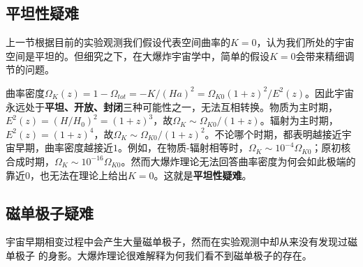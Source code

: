 \subsection{平坦性疑难}
上一节根据目前的实验观测我们假设代表空间曲率的$K=0$，认为我们所处的宇宙空间是平坦的。但细究之下，在大爆炸宇宙学中，简单的假设$K=0$会带来精细调节的问题。

曲率密度$\Omega_K(z) =
1-\Omega_{tot}=-K /{\left(Ha\right)}^2=\Omega_{K
0}{\left(1+z\right)}^2
/E^2(z)$。因此宇宙永远处于\textbf{平坦、开放、封闭}三种可能性之一，无法互相转换。物质为主时期，$E^2(z)={\left(H
/H_0\right)}^2={\left(1+z\right)}^3$，故$\Omega_K\sim \Omega_{K
0}
/{\left(1+z\right)}$。辐射为主时期，$E^2(z)={\left(1+z\right)}^{4}$，故$\Omega_K\sim\Omega_{K
0}
/{\left(1+z\right)}^2$。不论哪个时期，都表明越接近宇宙早期，曲率密度越接近$1$。例如，在物质-辐射相等时，$\Omega_K\sim
10^{-4}\Omega_{K 0}$；原初核合成时期，$\Omega_K\sim 10^{-16}\Omega_{K
0}$。然而大爆炸理论无法回答曲率密度为何会如此极端的靠近$0$，也无法在理论上给出$K=0$。这就是\textbf{平坦性疑难}。

\subsection{磁单极子疑难}
宇宙早期相变过程中会产生大量磁单极子，然而在实验观测中却从来没有发现过磁单极子
的身影。大爆炸理论很难解释为何我们看不到磁单极子的存在。
